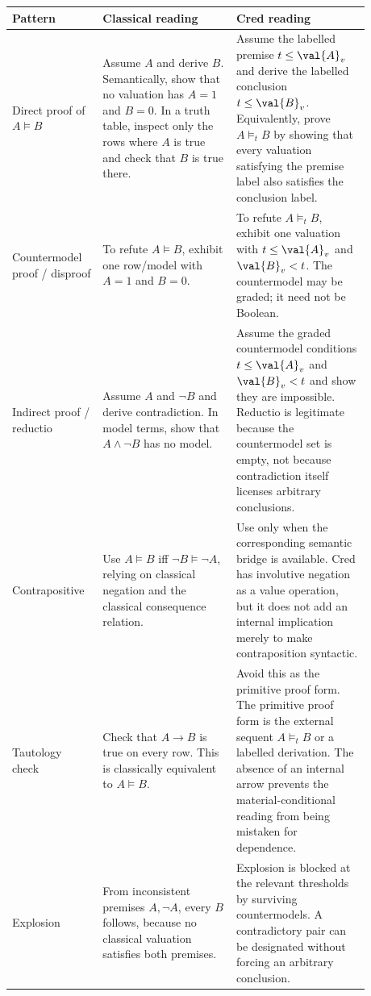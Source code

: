 \begin{table}[h]
\centering
\begin{tabular}{@{}p{0.20\linewidth}p{0.34\linewidth}p{0.34\linewidth}@{}}
\toprule
Pattern & Classical reading & Cred reading \\
\midrule
Direct proof of $A\models B$ &
Assume $A$ and derive $B$.  Semantically, show that no valuation has
$A=1$ and $B=0$.  In a truth table, inspect only the rows where $A$ is
true and check that $B$ is true there. &
Assume the labelled premise $t\le\val{A}_v$ and derive the labelled
conclusion $t\le\val{B}_v$.  Equivalently, prove
$A\models_t B$ by showing that every valuation satisfying the premise
label also satisfies the conclusion label. \\
\addlinespace
Countermodel proof / disproof &
To refute $A\models B$, exhibit one row/model with $A=1$ and $B=0$. &
To refute $A\models_t B$, exhibit one valuation with
$t\le\val{A}_v$ and $\val{B}_v<t$.  The countermodel may be graded; it
need not be Boolean. \\
\addlinespace
Indirect proof / reductio &
Assume $A$ and $\neg B$ and derive contradiction.  In model terms,
show that $A\land\neg B$ has no model. &
Assume the graded countermodel conditions
$t\le\val{A}_v$ and $\val{B}_v<t$ and show they are impossible.  Reductio
is legitimate because the countermodel set is empty, not because
contradiction itself licenses arbitrary conclusions. \\
\addlinespace
Contrapositive &
Use $A\models B$ iff $\neg B\models\neg A$, relying on classical
negation and the classical consequence relation. &
Use only when the corresponding semantic bridge is available.  Cred has
involutive negation as a value operation, but it does not add an
internal implication merely to make contraposition syntactic. \\
\addlinespace
Tautology check &
Check that $A\to B$ is true on every row.  This is classically
equivalent to $A\models B$. &
Avoid this as the primitive proof form.  The primitive proof form is the
external sequent $A\models_t B$ or a labelled derivation.  The absence
of an internal arrow prevents the material-conditional reading from
being mistaken for dependence. \\
\addlinespace
Explosion &
From inconsistent premises $A,\neg A$, every $B$ follows, because no
classical valuation satisfies both premises. &
Explosion is blocked at the relevant thresholds by surviving
countermodels.  A contradictory pair can be designated without forcing
an arbitrary conclusion. \\

\end{tabular}
\end{table}
